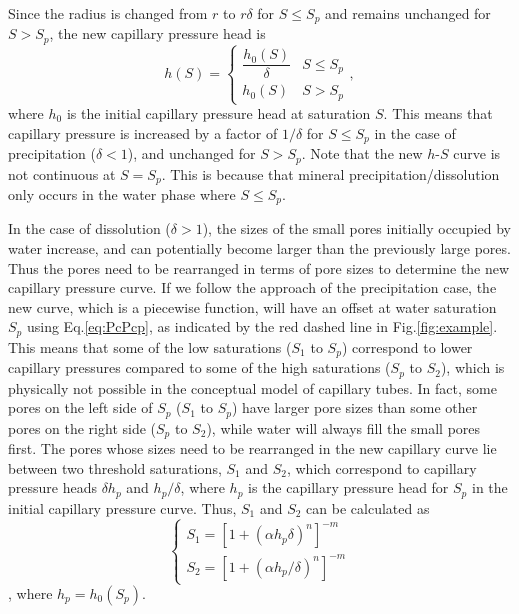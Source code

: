 \documentclass[preprint,12pt,authoryear]{elsarticle}
\begin{document}
Since the radius is changed from $r$ to $r \delta$ for $S\leq S_p$ and remains unchanged for $S>S_p$, the new capillary pressure head is
\begin{equation}
\label{eq:PcPcp}
h(S)= \begin{cases} 
      \dfrac{h_0(S)}{\delta} & S\leq S_p \\
      h_0(S) & S>S_p 
   \end{cases},
\end{equation}
where $h_0$ is the initial capillary pressure head at saturation $S$. This means that capillary pressure is increased by a factor of $1/\delta$ for $S\leq S_p$ in the case of precipitation ($\delta<1$), and unchanged for $S>S_p$. Note that the new $h$-$S$ curve is not continuous at $S=S_p$. This is  because that mineral precipitation/dissolution only occurs in the water phase where $S\leq S_p$.

In the case of dissolution ($\delta>1$), the sizes of the small pores initially occupied by water increase, and can potentially become larger than the previously large pores. Thus the pores need to be rearranged in terms of pore sizes to determine the new capillary pressure curve. If we follow the approach of the precipitation case, the new curve, which is a piecewise function, will have an offset at water saturation $S_p$ using Eq.\ref{eq:PcPcp}, as indicated by the red dashed line in Fig.\ref{fig:example}. This means that some of the low saturations ($S_1$ to $S_p$) correspond to lower capillary pressures compared to some of the high saturations ($S_p$ to $S_2$), which is physically not possible in the conceptual model of capillary tubes. In fact, some pores on the left side of $S_p$ ($S_1$ to $S_p$) have larger pore sizes than some other pores on the right side ($S_p$ to $S_2$), while water will always fill the small pores first. The pores whose sizes need to be rearranged in the new capillary curve lie between two threshold saturations, $S_1$ and $S_2$, which correspond to capillary pressure heads $\delta h_p$ and $h_p/\delta$, where $h_p$ is the capillary pressure head for $S_p$ in the initial capillary pressure curve. Thus, $S_1$ and $S_2$ can be calculated as
\begin{equation}
\label{eq:S1S2}
\begin{cases} 
      S_1=[1+(\alpha h_p\delta)^n]^{-m} \\
      S_2=[1+(\alpha h_p/\delta)^n]^{-m} 
   \end{cases}
\end{equation},
where $h_p=h_0(S_p)$.
\end{document}

